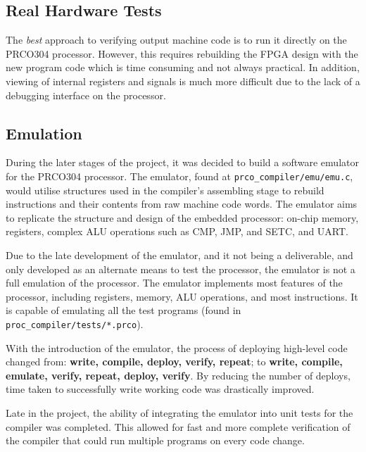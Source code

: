 \documentclass[11pt,a4paper]{report}
\newcommand{\scname}{PRCO304}
\begin{document}
\subsection*{Real Hardware Tests}
The \textit{best} approach to verifying output machine code is to run it directly on the \scname{} processor. However, this requires rebuilding the FPGA design with the new program code which is time consuming and not always practical. In addition, viewing of internal registers and signals is much more difficult due to the lack of a debugging interface on the processor.
 
\subsection*{Emulation}
During the later stages of the project, it was decided to build a software emulator for the \scname{} processor. The emulator, found at \verb|prco_compiler/emu/emu.c|, would utilise structures used in the compiler's assembling stage to rebuild instructions and their contents from raw machine code words. The emulator aims to replicate the structure and design of the embedded processor: on-chip memory, registers, complex ALU operations such as CMP, JMP, and SETC, and UART.

Due to the late development of the emulator, and it not being a deliverable, and only developed as an alternate means to test the processor, the emulator is not a full emulation of the processor. The emulator implements most features of the processor, including registers, memory, ALU operations, and most instructions. It is capable of emulating all the test programs (found in \verb|proc_compiler/tests/*.prco|).

With the introduction of the emulator, the process of deploying high-level code changed from: \textbf{write, compile, deploy, verify, repeat}; to \textbf{write, compile, emulate, verify, repeat, deploy, verify}. By reducing the number of deploys, time taken to successfully write working code was drastically improved.

Late in the project, the ability of integrating the emulator into unit tests for the compiler was completed. This allowed for fast and more complete verification of the compiler that could run multiple programs on every code change.
\end{document}
